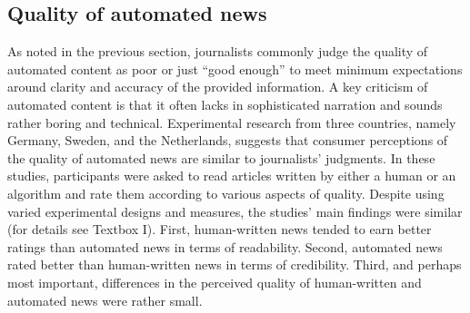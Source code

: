 \documentclass[notoc, symmetric, nobib, nols]{towcenter-book}
\begin{document}
\subsection{Quality of automated news}

As noted in the previous section, journalists commonly judge the quality of automated content as poor or just ``good enough'' to meet minimum expectations around clarity and accuracy of the provided information. A key criticism of automated content is that it often lacks in sophisticated narration and sounds rather boring and technical. Experimental research from three countries, namely Germany, Sweden, and the Netherlands, suggests that consumer perceptions of the quality of automated news are similar to journalists’ judgments. In these studies, participants were asked to read articles written by either a human or an algorithm and rate them according to various aspects of quality.\cite{clerwall15}\cite{kaa14}\cite{graefe15} Despite using varied experimental designs and measures, the studies’ main findings were similar (for details see Textbox I). First, human-written news tended to earn better ratings than automated news in terms of readability. Second, automated news rated better than human-written news in terms of credibility. Third, and perhaps most important, differences in the perceived quality of human-written and automated news were rather small.
\end{document}
